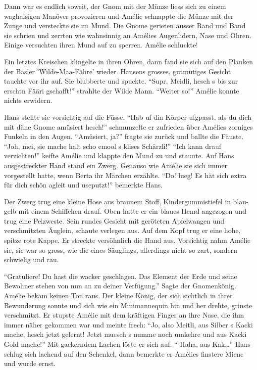 \documentclass[11pt,titlepage,a5paper]{book}
\begin{document}
Dann war es endlich soweit, der Gnom mit der Münze liess sich zu einem waghalsigen Manöver provozieren und Amélie schnappte die Münze mit der Zunge und versteckte sie im Mund. Die Gnome gerieten ausser Rand und Band sie schrien und zerrten wie wahnsinnig an Amélies Augenlidern, Nase und Ohren. Einige versuchten ihren Mund auf zu sperren. Amélie schluckte!

Ein letztes Kreischen klingelte in ihren Ohren, dann fand sie sich auf den Planken der Basler 'Wilde-Maa-Fähre' wieder. Hansens grosses, gutmütiges Gesicht tauchte vor ihr auf. Sie blubberte und spuckte. "`Supr, Meidli, hesch s bis zur erschtn Fääri gschafft!"' strahlte der Wilde Mann. "`Weiter so!"' Amélie konnte nichts erwidern.

Hans stellte sie vorsichtig auf die Füsse. "`Hab uf din Körper ufgpasst, als du dich mit däne Gnome amüsiert hesch!"' schmunzelte er zufrieden über Amélies zorniges Funkeln in den Augen. "`Amüsiert, ja?"' fragte sie zurück und ballte die Fäuste. "`Joh, mei, sie mache halt scho emool s klises Schärzli!"' "`Ich kann drauf verzichten!"' keifte Amélie und klappte den Mund zu und staunte. Auf Hans ausgestreckter Hand stand ein Zwerg. Genauso wie Amélie sie sich immer vorgestellt hatte, wenn Berta ihr Märchen erzählte. "`Do! lueg! Es hät sich extra für dich schön agleit und useputzt!"' bemerkte Hans.

Der Zwerg trug eine kleine Hose aus braunem Stoff, Kindergummistiefel in blau-gelb mit einem Schiffchen drauf. Oben hatte er ein blaues Hemd angezogen und trug eine Pelzweste. Sein rundes Gesicht mit geröteten Apfelwangen und verschmitzten Äuglein, schaute verlegen aus. Auf dem Kopf trug er eine hohe, spitze rote Kappe. Er streckte versöhnlich die Hand aus. Vorsichtig nahm Amélie sie, sie war so gross, wie die eines Säuglings, allerdings nicht so zart, sondern schwielig und rau.

"`Gratuliere! Du hast die wacker geschlagen. Das Element der Erde und seine Bewohner stehen von nun an zu deiner Verfügung."' Sagte der Gnomenkönig. Amélie bekam keinen Ton raus. Der kleine König, der sich sichtlich in ihrer Bewunderung sonnte und sich wie ein Minimannequin hin und her drehte, grinste verschmitzt. Er stupste Amélie mit dem kräftigen Finger an ihre Nase, die ihm immer näher gekommen war und meinte frech: "`Jo, also Meitli, aus Silber s Kacki mache, hesch jetzt gelernt! Jetzt muesch s numme noch umkehre und aus Kacki Gold mache!"' Mit gackerndem Lachen löste er sich auf. "` Haha, aus Kak\dots"' Hans schlug sich lachend auf den Schenkel, dann bemerkte er Amélies finstere Miene und wurde ernst.
\end{document}

